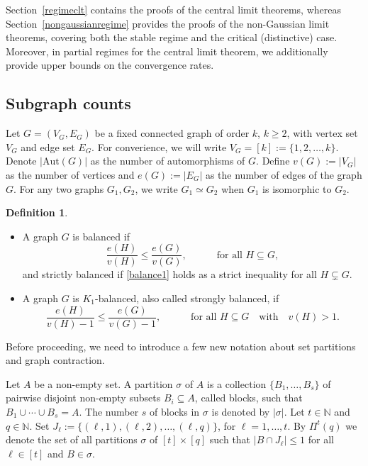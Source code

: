 \documentclass{article}
\theoremstyle{definition}
\newtheorem{defi}[theorem]{Definition}
\numberwithin{equation}{section}
\theoremstyle{remark}
\newcommand{\N}{\mathbb{N}}
\begin{document}
Section~\ref{regimeclt} contains the proofs of the central limit theorems, whereas Section~\ref{nongaussianregime} provides the proofs of the non-Gaussian limit theorems, covering both the stable regime and the critical (distinctive) case. Moreover, in partial regimes for the central limit theorem, we additionally provide upper bounds on the convergence rates.




\subsection{Subgraph counts}
Let $G=(V_G,E_G)$ be a fixed connected graph of order $k$, $k\ge2$, with vertex set $V_G$ and edge set $E_G$. For converience, we will write $V_G=[k]:=\{1,2,\ldots,k\}.$
Denote $|\mathrm{Aut}(G)|$ as the number of automorphisms of $G$. 
Define $v(G):=|V_G|$ as the number of vertices and $e(G):=|E_G|$ as the number of edges of the graph $G$. 
For any two graphs $G_1,G_2$, we write $G_1\simeq G_2$ when $G_1$ is isomorphic to $G_2$. 
\begin{defi}{\cite[pp.~64-65]{JLR}}
\begin{itemize}
\item[1)]
A graph $G$ is balanced if 
\begin{equation}
  \frac{e(H)}{v(H)}\leq \frac{e(G)}{v(G)},
  \qquad \quad \text{for all }H\subseteq G,   \label{balance1} 
    \end{equation}
and strictly balanced if \eqref{balance1} 
holds as a strict inequality for all $H\subsetneq G$. 
\item[2)] A graph $G$ is $K_1$-balanced, also called strongly balanced, if 
\begin{equation}
	\frac{e(H)}{v(H)-1}\le\frac{e(G)}{v(G)-1}, \qquad \quad \text{for all }H\subseteq G \quad \text{with} \quad v(H)>1.
	\label{balance2}
\end{equation}

\end{itemize}
  \end{defi}
Before proceeding, we need to introduce a few new notation about set partitions and graph contraction. 

Let $A$ be a non-empty set. A partition $\sigma$ of $A$ is a collection $\{B_1,\dots,B_s\}$ of pairwise disjoint non-empty subsets $B_i\subseteq A$, called blocks, such that $B_1\cup\cdots\cup B_s=A$. The number $s$ of blocks in $\sigma$ is denoted by $|\sigma|$.
Let $t\in\N$ and $q\in\N$. Set $J_\ell:=\{(\ell,1),(\ell,2),\dots,(\ell,q)\}$, for $\ell=1,\dots,t.$ By $\Pi^t(q)$ we denote the set of all partitions $\sigma$ of $[t]\times[q]$ such that $|B\cap J_\ell|\le1$ for all $\ell\in[t]$ and $B\in\sigma$.
\end{document}
